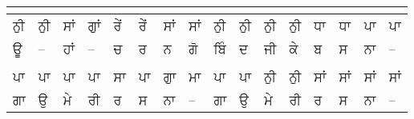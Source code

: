 \documentclass[10pt]{article}
\begin{document}
\begin{table}[!htb]
{\begin{tabular}{llllllllllllllll}
\multicolumn{16}{l}{}                                                                                                                                                                                                                                                                                                                                                                                                                                           \\ \hline
\multicolumn{1}{|l|}{ਨੁੀ}         & \multicolumn{1}{l|}{ਨੁੀ} & \multicolumn{1}{l|}{ਸਾਂ} & \multicolumn{1}{l|}{ਗੁਾਂ} & \multicolumn{1}{l|}{ਰੇਂ} & \multicolumn{1}{l|}{ਰੇਂ} & \multicolumn{1}{l|}{ਸਾਂ} & \multicolumn{1}{l|}{ਸਾਂ} & \multicolumn{1}{l|}{ਨੁੀ}         & \multicolumn{1}{l|}{ਨੁੀ} & \multicolumn{1}{l|}{ਨੁੀ} & \multicolumn{1}{l|}{ਨੁੀ} & \multicolumn{1}{l|}{ਧਾ}  & \multicolumn{1}{l|}{ਧਾ}  & \multicolumn{1}{l|}{ਪਾ}  & \multicolumn{1}{l|}{ਪਾ}  \\ \hline
\multicolumn{1}{|l|}{ਊ}           & \multicolumn{1}{l|}{--}  & \multicolumn{1}{l|}{ਹਾਂ} & \multicolumn{1}{l|}{--}   & \multicolumn{1}{l|}{ਚ}   & \multicolumn{1}{l|}{ਰ}   & \multicolumn{1}{l|}{ਨ}   & \multicolumn{1}{l|}{ਗੋ}  & \multicolumn{1}{l|}{ਬਿੰ}         & \multicolumn{1}{l|}{ਦ}   & \multicolumn{1}{l|}{ਜੀ}  & \multicolumn{1}{l|}{ਕੇ}  & \multicolumn{1}{l|}{ਬ}   & \multicolumn{1}{l|}{ਸ}   & \multicolumn{1}{l|}{ਨਾ}  & \multicolumn{1}{l|}{--}  \\ \hline
\multicolumn{16}{l}{}                                                                                                                                                                                                                                                                                                                                                                                                                                           \\ \hline
\multicolumn{1}{|l|}{ਪਾ}          & \multicolumn{1}{l|}{ਪਾ}  & \multicolumn{1}{l|}{ਪਾ}  & \multicolumn{1}{l|}{ਪਾ}   & \multicolumn{1}{l|}{ਸਾ}  & \multicolumn{1}{l|}{ਪਾ}  & \multicolumn{1}{l|}{ਗੁਾ} & \multicolumn{1}{l|}{ਮਾ}  & \multicolumn{1}{l|}{ਪਾ}          & \multicolumn{1}{l|}{ਪਾ}  & \multicolumn{1}{l|}{ਨੁੀ} & \multicolumn{1}{l|}{ਨੁੀ} & \multicolumn{1}{l|}{ਸਾਂ} & \multicolumn{1}{l|}{ਸਾਂ} & \multicolumn{1}{l|}{ਸਾਂ} & \multicolumn{1}{l|}{ਸਾਂ} \\ \hline
\multicolumn{1}{|l|}{ਗਾ}          & \multicolumn{1}{l|}{ਉ}   & \multicolumn{1}{l|}{ਮੇ}  & \multicolumn{1}{l|}{ਰੀ}   & \multicolumn{1}{l|}{ਰ}   & \multicolumn{1}{l|}{ਸ}   & \multicolumn{1}{l|}{ਨਾ}  & \multicolumn{1}{l|}{--}  & \multicolumn{1}{l|}{ਗਾ}          & \multicolumn{1}{l|}{ਉ}   & \multicolumn{1}{l|}{ਮੇ}  & \multicolumn{1}{l|}{ਰੀ}  & \multicolumn{1}{l|}{ਰ}   & \multicolumn{1}{l|}{ਸ}   & \multicolumn{1}{l|}{ਨਾ}  & \multicolumn{1}{l|}{--}  \\ \hline
\end{tabular} } \quad
\end{table}
\end{document}
